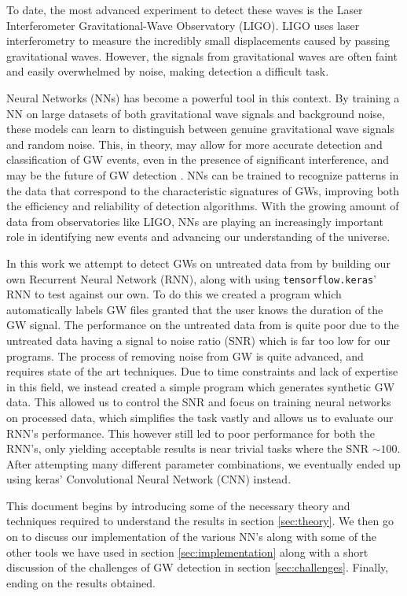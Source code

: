\documentclass[%
reprint,
amsmath,amssymb,
aps,
]{revtex4-2}
\begin{document}
To date, the most advanced experiment to detect these waves is the Laser Interferometer Gravitational-Wave Observatory (LIGO). LIGO uses laser interferometry to measure the incredibly small displacements caused by passing gravitational waves. However, the signals from gravitational waves are often faint and easily overwhelmed by noise, making detection a difficult task.

Neural Networks (NNs) has become a powerful tool in this context. By training a NN on large datasets of both gravitational wave signals and background noise, these models can learn to distinguish between genuine gravitational wave signals and random noise. This, in theory, may allow for more accurate detection and classification of GW events, even in the presence of significant interference, and may be the future of GW detection \cite{Marx:2024wjt, skliris2024}. NNs can be trained to recognize patterns in the data that correspond to the characteristic signatures of GWs, improving both the efficiency and reliability of detection algorithms. With the growing amount of data from observatories like LIGO, NNs are playing an increasingly important role in identifying new events and advancing our understanding of the universe.

In this work we attempt to detect GWs on untreated data from \cite{gwosc} by building our own Recurrent Neural Network (RNN), along with using \texttt{tensorflow.keras}' RNN to test against our own. To do this we created a program which automatically labels GW files granted that the user knows the duration of the GW signal. The performance on the untreated data from \cite{gwosc} is quite poor due to the untreated data having a signal to noise ratio (SNR) which is far too low for our programs. The process of removing noise from GW is quite advanced, and requires state of the art techniques. Due to time constraints and lack of expertise in this field, we instead created a simple program which generates synthetic GW data. This allowed us to control the SNR and focus on training neural networks on processed data, which simplifies the task vastly and allows us to evaluate our RNN's performance. This however still led to poor performance for both the RNN's, only yielding acceptable results is near trivial tasks where the SNR $\sim100$. After attempting many different parameter combinations, we eventually ended up using keras' Convolutional Neural Network (CNN) instead.

This document begins by introducing some of the necessary theory and techniques required to understand the results in section \ref{sec:theory}. We then go on to discuss our implementation of the various NN's along with some of the other tools we have used in section \ref{sec:implementation} along with a short discussion of the challenges of GW detection in section \ref{sec:challenges}. Finally, ending on the results obtained.
\end{document}
